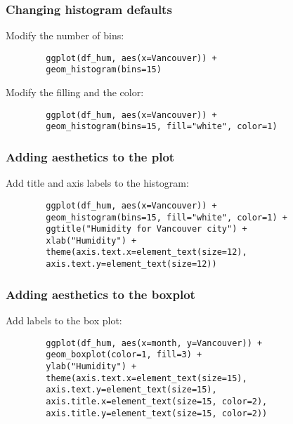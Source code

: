 \documentclass{beamer}
\begin{document}
	\begin{frame}[fragile]
		\frametitle{Changing histogram defaults}

		Modify the number of bins:

		\vspace{2em}

		\begin{exampleblock}{}
		\begin{BVerbatim}
		ggplot(df_hum, aes(x=Vancouver)) + 
		geom_histogram(bins=15)
		\end{BVerbatim}
		\end{exampleblock}{}

		\vspace{2em}

		Modify the filling and the color:

		\vspace{2em}

		\begin{exampleblock}{}
		\begin{BVerbatim}
		ggplot(df_hum, aes(x=Vancouver)) + 
		geom_histogram(bins=15, fill="white", color=1)
		\end{BVerbatim}
		\end{exampleblock}{}
	\end{frame}

	\begin{frame}[fragile]
		\frametitle{Adding aesthetics to the plot}

		Add title and axis labels to the histogram:

		\vspace{2em}

		\begin{exampleblock}{}
		\begin{BVerbatim}
		ggplot(df_hum, aes(x=Vancouver)) + 
		geom_histogram(bins=15, fill="white", color=1) +
		ggtitle("Humidity for Vancouver city") +
		xlab("Humidity") +
		theme(axis.text.x=element_text(size=12),
		axis.text.y=element_text(size=12))
		\end{BVerbatim}
		\end{exampleblock}{}
		
	\end{frame}

	\begin{frame}[fragile]
		\frametitle{Adding aesthetics to the boxplot}

		Add labels to the box plot:

		\vspace{2em}

		\begin{exampleblock}{}
		\begin{BVerbatim}
		ggplot(df_hum, aes(x=month, y=Vancouver)) + 
		geom_boxplot(color=1, fill=3) + 
		ylab("Humidity") + 
		theme(axis.text.x=element_text(size=15),
		axis.text.y=element_text(size=15),
		axis.title.x=element_text(size=15, color=2),
		axis.title.y=element_text(size=15, color=2))
		\end{BVerbatim}
		\end{exampleblock}{}
		
	\end{frame}
\end{document}
